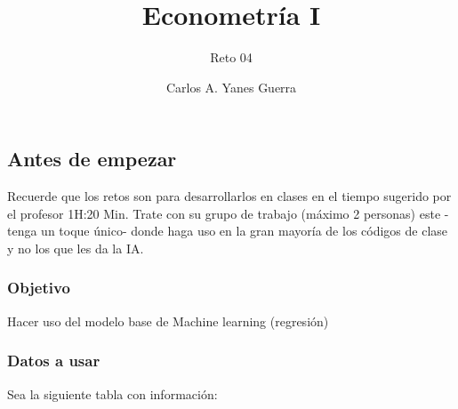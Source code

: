 \documentclass[
]{article}
\title{Econometría I}
\subtitle{Reto 04}
\author[]{Carlos A. Yanes
Guerra}
\affil{Universidad
del Norte \textbar{} Departamento de Economía}
\date{}
\begin{document}
\maketitle

{
\hypersetup{linkcolor=}
\setcounter{tocdepth}{3}
\tableofcontents
}
\subsection{Antes de empezar}\label{antes-de-empezar}

Recuerde que los retos son para desarrollarlos en clases en el tiempo
sugerido por el profesor 1H:20 Min. Trate con su grupo de trabajo
(máximo 2 personas) este -tenga un toque único- donde haga uso en la
gran mayoría de los códigos de clase y no los que les da la IA.

\subsubsection{Objetivo}\label{objetivo}

Hacer uso del modelo base de Machine learning (regresión)

\subsubsection{Datos a usar}\label{datos-a-usar}

Sea la siguiente tabla con información:
\end{document}
